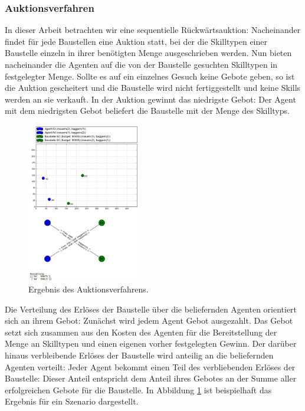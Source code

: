 \subsubsection{Auktionsverfahren}
In dieser Arbeit betrachten wir eine sequentielle Rückwärtsauktion: Nacheinander findet für jede Baustellen eine Auktion statt, bei der die Skilltypen einer Baustelle einzeln in ihrer benötigten Menge ausgeschrieben werden. Nun bieten nacheinander die Agenten auf die  von der Baustelle gesuchten Skilltypen in festgelegter Menge. Sollte es auf ein einzelnes Gesuch keine Gebote geben, so ist die Auktion gescheitert und die Baustelle wird nicht fertiggestellt und keine Skills werden an sie verkauft. In der Auktion gewinnt das niedrigste Gebot: Der Agent mit dem niedrigsten Gebot beliefert die Baustelle mit der Menge des Skilltyps.

\begin{figure}
  \centering
  \includegraphics[width=0.45\textwidth]{example-srg.png}
  \caption{Ergebnis des Auktionsverfahrens.}
  \label{example-srg}
\end{figure}

Die Verteilung des Erlöses der Baustelle über die beliefernden Agenten orientiert sich an ihrem Gebot: Zunächst wird jedem Agent Gebot ausgezahlt. Das Gebot setzt sich zusammen aus den Kosten des Agenten für die Bereitstellung der Menge an Skilltypen und einen eigenen vorher festgelegten Gewinn. Der darüber hinaus verbleibende Erlöses der Baustelle wird anteilig an die beliefernden Agenten verteilt: Jeder Agent bekommt einen Teil des verbliebenden Erlöses der Baustelle: Dieser Anteil entspricht dem Anteil ihres Gebotes an der Summe aller erfolgreichen Gebote für die Baustelle. In Abbildung \ref{example-srg} ist beispielhaft das Ergebnis für ein Szenario dargestellt.

